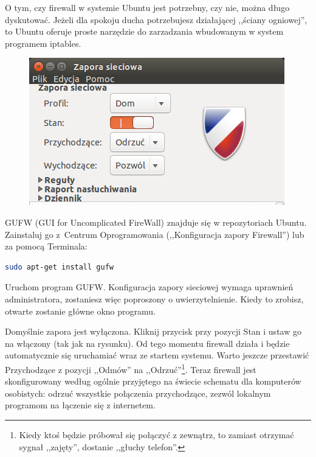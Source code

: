 O tym, czy firewall w systemie Ubuntu jest potrzebny, czy nie, można długo dyskutować. Jeżeli dla spokoju ducha potrzebujesz działającej ,,ściany ogniowej'', to Ubuntu oferuje proste narzędzie do zarzadzania wbudowanym w system programem iptables.

\begin{figure}
	\vspace{-10pt}
	\includegraphics[width=\linewidth]{images/programy_gufw.png}
\end{figure}

GUFW (\textcolor{ubuntu_orange}{GUI for Uncomplicated FireWall}) znajduje się w repozytoriach Ubuntu. Zainstaluj go z~Centrum Oprogramowania (,,Konfiguracja zapory Firewall'') lub za pomocą Terminala:
\begin{lstlisting}[language=bash]
sudo apt-get install gufw
\end{lstlisting}

Uruchom program GUFW. Konfiguracja zapory sieciowej wymaga uprawnień administratora, zostaniesz więc poproszony o uwierzytelnienie. Kiedy to zrobisz, otwarte zostanie główne okno programu.

Domyślnie zapora jest wyłączona. Kliknij przycisk przy pozycji \textcolor{ubuntu_orange}{Stan} i ustaw go na włączony (tak jak na rysunku). Od tego momentu firewall działa i będzie automatycznie się uruchamiać wraz ze startem systemu. Warto jeszcze przestawić \textcolor{ubuntu_orange}{Przychodzące} z pozycji ,,Odmów'' na ,,Odrzuć''\footnote{Kiedy ktoś będzie próbował się połączyć z zewnątrz, to zamiast otrzymać sygnał ,,zajęty'', dostanie ,,głuchy telefon''.}. Teraz firewall jest skonfigurowany według ogólnie przyjętego na świecie schematu dla komputerów osobistych: odrzuć wszystkie połączenia przychodzące, zezwól lokalnym programom na łączenie się z internetem.

